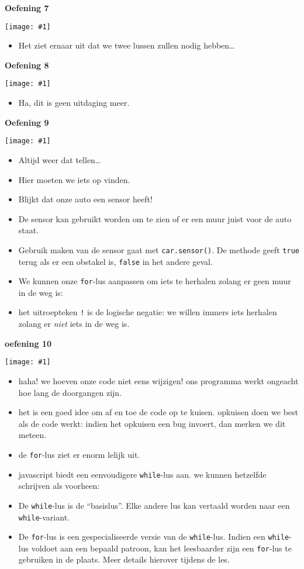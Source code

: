 \documentclass[a4paper]{article}
\newcommand{\newexercise}[1]{\clearpage\begin{center}\Huge\bf #1\end{center}}
\newcommand{\exercisemap}[1]{\begin{center}\texttt{[image: \#1]}\end{center}}
\newcommand{\code}[1]{
  \begin{center}
    \begin{minipage}{.8\linewidth}
      
    \end{minipage}
  \end{center}
}
\begin{document}
\newexercise{Oefening 7}
\exercisemap{ex7}

\begin{itemize}
  \item Het ziet ernaar uit dat we twee lussen zullen nodig hebben\dots
\end{itemize}


\newexercise{Oefening 8}
\exercisemap{ex8}

\begin{itemize}
  \item Ha, dit is geen uitdaging meer.
\end{itemize}


\newexercise{Oefening 9}
\exercisemap{ex9}

\begin{itemize}
  \item Altijd weer dat tellen\dots
  \item Hier moeten we iets op vinden.
  \item Blijkt dat onze auto een sensor heeft!
  \item De sensor kan gebruikt worden om te zien of er een muur juist voor de auto staat.
  \item Gebruik maken van de sensor gaat met \verb'car.sensor()'.
        De methode geeft \verb'true' terug als er een obstakel is, \verb'false' in het andere geval.
  \item We kunnen onze \verb'for'-lus aanpassen om iets te herhalen zolang er geen muur in de weg is:
        \code{for-sensor.js}
  \item het uitroepteken \verb'!' is de logische negatie: we willen immers
        iets herhalen zolang er \emph{niet} iets in de weg is.
\end{itemize}


\newexercise{oefening 10}
\exercisemap{ex10}

\begin{itemize}
  \item haha! we hoeven onze code niet eens wijzigen! ons programma werkt
        ongeacht hoe lang de doorgangen zijn.
  \item het is een goed idee om af en toe de code op te kuisen.
        opkuisen doen we best als de code werkt: indien
        het opkuisen een bug invoert, dan merken we dit meteen.
  \item de \verb'for'-lus ziet er enorm lelijk uit.
  \item javascript biedt een eenvoudigere \verb'while'-lus aan.
        we kunnen hetzelfde schrijven als voorheen:
        \code{while.js}
  \item De \verb'while'-lus is de ``basislus''. Elke andere lus
        kan vertaald worden naar een \verb'while'-variant.
  \item De \verb'for'-lus is een gespecialiseerde versie van de
        \verb'while'-lus. Indien een \verb'while'-lus voldoet aan een bepaald
        patroon, kan het leesbaarder zijn een \verb'for'-lus te gebruiken in de plaats.
        Meer details hierover tijdens de les.
\end{itemize}
\end{document}
